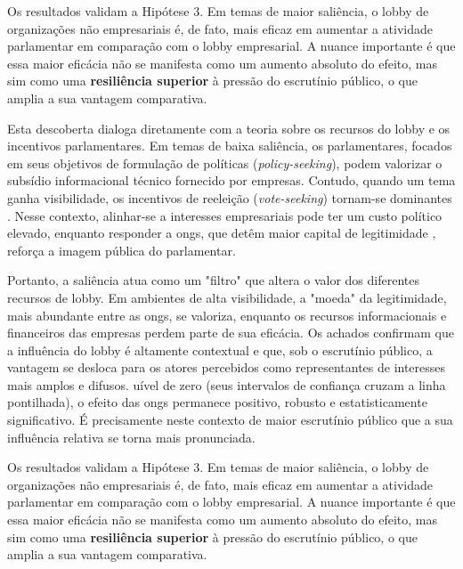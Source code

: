 Os resultados validam a Hipótese 3. Em temas de maior saliência, o lobby de organizações não empresariais é, de fato, mais eficaz em aumentar a atividade parlamentar em comparação com o lobby empresarial. A nuance importante é que essa maior eficácia não se manifesta como um aumento absoluto do efeito, mas sim como uma \textbf{resiliência superior} à pressão do escrutínio público, o que amplia a sua vantagem comparativa.


Esta descoberta dialoga diretamente com a teoria sobre os recursos do lobby e os incentivos parlamentares. Em temas de baixa saliência, os parlamentares, focados em seus objetivos de formulação de políticas (\textit{policy-seeking}), podem valorizar o subsídio informacional técnico fornecido por empresas. Contudo, quando um tema ganha visibilidade, os incentivos de reeleição (\textit{vote-seeking}) tornam-se dominantes \cite{mayhew2004congress}. Nesse contexto, alinhar-se a interesses empresariais pode ter um custo político elevado, enquanto responder a \acrshort{ong}s, que detêm maior capital de legitimidade \cite{bunea2018legitimacy}, reforça a imagem pública do parlamentar.

Portanto, a saliência atua como um "filtro" que altera o valor dos diferentes recursos de lobby. Em ambientes de alta visibilidade, a "moeda" da legitimidade, mais abundante entre as \acrshort{ong}s, se valoriza, enquanto os recursos informacionais e financeiros das empresas perdem parte de sua eficácia. Os achados confirmam que a influência do lobby é altamente contextual e que, sob o escrutínio público, a vantagem se desloca para os atores percebidos como representantes de interesses mais amplos e difusos.
uível de zero (seus intervalos de confiança cruzam a linha pontilhada), o efeito das \acrshort{ong}s permanece positivo, robusto e estatisticamente significativo. É precisamente neste contexto de maior escrutínio público que a sua influência relativa se torna mais pronunciada.

Os resultados validam a Hipótese 3. Em temas de maior saliência, o lobby de organizações não empresariais é, de fato, mais eficaz em aumentar a atividade parlamentar em comparação com o lobby empresarial. A nuance importante é que essa maior eficácia não se manifesta como um aumento absoluto do efeito, mas sim como uma \textbf{resiliência superior} à pressão do escrutínio público, o que amplia a sua vantagem comparativa.



